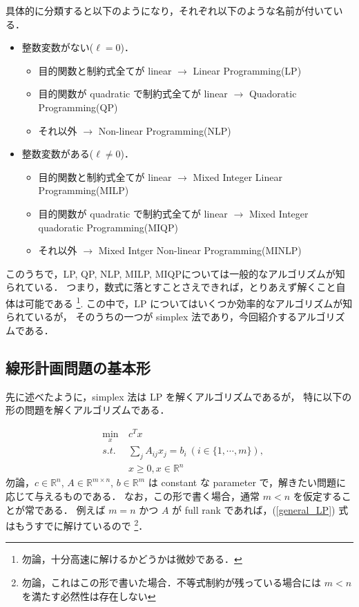 \documentclass[11pt, a4]{article}
\begin{document}
具体的に分類すると以下のようになり，それぞれ以下のような名前が付いている．
\begin{itemize}
\item 整数変数がない($\ell = 0$)．
  \begin{itemize}
  \item 目的関数と制約式全てが linear $\rightarrow$ Linear Programming(LP)
  \item 目的関数が quadratic で制約式全てが linear $\rightarrow$ Quadoratic Programming(QP)
  \item それ以外 $\rightarrow$ Non-linear Programming(NLP)
  \end{itemize}
\item 整数変数がある($\ell \neq 0$)．
  \begin{itemize}
  \item 目的関数と制約式全てが linear $\rightarrow$ Mixed Integer Linear Programming(MILP)
  \item 目的関数が quadratic で制約式全てが linear $\rightarrow$ Mixed Integer quadoratic Programming(MIQP)
  \item それ以外 $\rightarrow$ Mixed Intger Non-linear Programming(MINLP)
  \end{itemize}
\end{itemize}
このうちで，LP, QP, NLP, MILP, MIQPについては一般的なアルゴリズムが知られている．
つまり，数式に落とすことさえできれば，とりあえず解くこと自体は可能である
\footnote{勿論，十分高速に解けるかどうかは微妙である．}.
この中で，LP についてはいくつか効率的なアルゴリズムが知られているが，
そのうちの一つが simplex 法であり，今回紹介するアルゴリズムである．

\subsection{線形計画問題の基本形}
先に述べたように，simplex 法は LP を解くアルゴリズムであるが，
特に以下の形の問題を解くアルゴリズムである．

\begin{eqnarray}
  &\min_{x}&\ c^Tx\nonumber\\
  &s.t.&\ \sum_jA_{ij}x_j = b_i\ (i \in \{1, \cdots, m\}) , \nonumber\\
  &\ &\ x\geq 0, x \in \mathbb{R}^n
  \label{general_LP}
\end{eqnarray}
勿論，$c \in \mathbb{R}^n$, $A \in \mathbb{R}^{m\times n}$, $b\in \mathbb{R}^m$ は
constant な parameter で，解きたい問題に応じて与えるものである．
なお，この形で書く場合，通常 $m < n$ を仮定することが常である．
例えば $m = n$ かつ $A$ が full rank であれば，(\ref{general_LP}) 式はもうすでに解けているので
\footnote{勿論，これはこの形で書いた場合．不等式制約が残っている場合には $m < n$ を満たす必然性は存在しない}．
\end{document}
